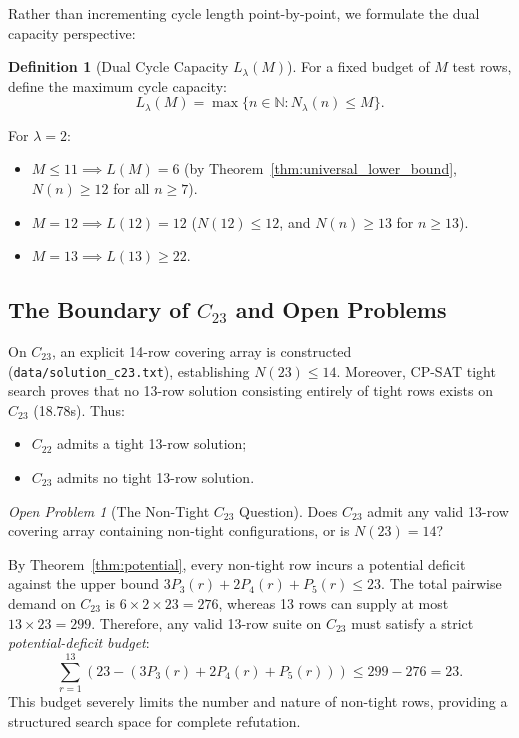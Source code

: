 \documentclass[11pt,a4paper]{article}
\theoremstyle{definition}
\newtheorem{definition}[theorem]{Definition}
\theoremstyle{remark}
\newtheorem{openproblem}[theorem]{Open Problem}
\begin{document}
Rather than incrementing cycle length point-by-point, we formulate the dual capacity perspective:

\begin{definition}[Dual Cycle Capacity $L_\lambda(M)$]
For a fixed budget of $M$ test rows, define the maximum cycle capacity:
\begin{equation}
    L_\lambda(M) = \max \{n \in \mathbb{N} : N_\lambda(n) \le M\}.
\end{equation}
\end{definition}

For $\lambda = 2$:
\begin{itemize}
    \item $M \le 11 \implies L(M) = 6$ (by Theorem~\ref{thm:universal_lower_bound}, $N(n) \ge 12$ for all $n \ge 7$).
    \item $M = 12 \implies L(12) = 12$ ($N(12) \le 12$, and $N(n) \ge 13$ for $n \ge 13$).
    \item $M = 13 \implies L(13) \ge 22$.
\end{itemize}

\subsection{The Boundary of $C_{23}$ and Open Problems}

On $C_{23}$, an explicit 14-row covering array is constructed (\texttt{data/solution\_c23.txt}), establishing $N(23) \le 14$.
Moreover, CP-SAT tight search proves that no 13-row solution consisting entirely of tight rows exists on $C_{23}$ (18.78s).
Thus:
\begin{itemize}
    \item $C_{22}$ admits a tight 13-row solution;
    \item $C_{23}$ admits no tight 13-row solution.
\end{itemize}

\begin{openproblem}[The Non-Tight $C_{23}$ Question]
Does $C_{23}$ admit any valid 13-row covering array containing non-tight configurations, or is $N(23) = 14$?
\end{openproblem}

By Theorem~\ref{thm:potential}, every non-tight row incurs a potential deficit against the upper bound $3P_3(r) + 2P_4(r) + P_5(r) \le 23$. The total pairwise demand on $C_{23}$ is $6 \times 2 \times 23 = 276$, whereas 13 rows can supply at most $13 \times 23 = 299$.
Therefore, any valid 13-row suite on $C_{23}$ must satisfy a strict \emph{potential-deficit budget}:
\begin{equation}
    \sum_{r=1}^{13} \left( 23 - (3P_3(r) + 2P_4(r) + P_5(r)) \right) \le 299 - 276 = 23.
\end{equation}
This budget severely limits the number and nature of non-tight rows, providing a structured search space for complete refutation.
\end{document}
